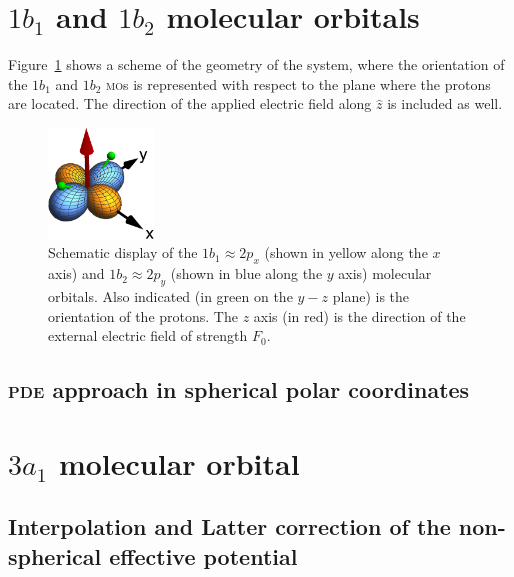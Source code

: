 
\section{$1b_{1}$ and $1b_{2}$ molecular orbitals}
\label{ch:1b1_1b2}

Figure~\ref{fig:h2o_1b1_1b2} shows a scheme of the geometry of the
system, where the orientation of the $1b_{1}$ and $1b_{2}$
\textsc{mo}s is represented with respect to the plane where the
protons are located. The direction of the applied electric field along
$\hat{z}$ is included as well.

\begin{figure}
  \centering
  \includegraphics[width=0.25\textwidth]{figures/ch_H2O/orbitals.eps}
  \caption{Schematic display of the $1b_{1}\approx 2p_{x}$ (shown in
    yellow along the $x$ axis) and $1b_{2}\approx 2p_{y}$ (shown in
    blue along the $y$ axis) molecular orbitals. Also indicated (in
    green on the $y-z$ plane) is the orientation of the protons. The
    $z$ axis (in red) is the direction of the external electric field
    of strength $F_{0}$.}
  \label{fig:h2o_1b1_1b2}
\end{figure}

\subsection{\textsc{pde} approach in spherical polar coordinates}

\section{$3a_{1}$ molecular orbital}
\label{ch:3a1}
\subsection{Interpolation and Latter correction of the
  non-spherical effective potential}



